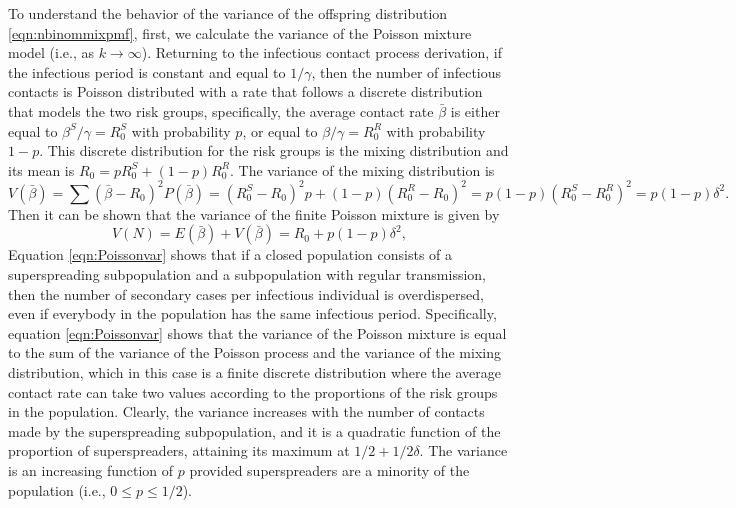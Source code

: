 \documentclass{imammb}
\numberwithin{equation}{section}
\begin{document}
To understand the behavior of the variance of the offspring distribution \eqref{eqn:nbinommixpmf}, first, we calculate the variance of the Poisson mixture model (i.e., as $k \rightarrow \infty$). Returning to the infectious contact process derivation, if the infectious period is constant and equal to $1/\gamma$, then the number of infectious contacts is Poisson distributed with a rate that follows a discrete distribution that models the two risk groups, specifically, the average contact rate $\bar{\beta}$ is either equal to $\beta^S/\gamma=R_0^S$ with probability $p$, or equal to $\beta/\gamma=R_0^R$ with probability $1-p$. This discrete distribution for the risk groups is the mixing distribution \citep{Karlis2005-az} and its mean is $R_0 = p R_0^S + (1-p) R_0^R$. The variance of the mixing distribution is 
\begin{equation}\label{eqn:mixingvar}
  V(\bar{\beta})  = \sum (\bar{\beta} - R_0)^2 P(\bar{\beta}) =  (R_0^S - R_0)^2 p + (1-p)(R_0^R - R_0)^2 = p(1-p)(R_0^S - R_0^R)^2 = p(1-p)\delta^2. 
\end{equation}
Then it can be shown that the variance of the finite Poisson mixture is  given by \citep{Karlis2005-az}
\begin{equation}\label{eqn:Poissonvar}
  V(N)  = E(\bar{\beta}) + V(\bar{\beta}) = R_0 + p(1-p)\delta^2, 
\end{equation}
Equation \eqref{eqn:Poissonvar} shows that if a closed population consists of a superspreading subpopulation and a subpopulation with regular transmission, then the number of secondary cases per infectious individual is overdispersed, even if everybody in the population has the same infectious period. Specifically, equation \eqref{eqn:Poissonvar} shows that the variance of the Poisson mixture is equal to the sum of the variance of the Poisson process and the variance of the mixing distribution, which in this case is a finite discrete distribution where the average contact rate can take two values according to the proportions of the risk groups in the population. Clearly, the variance increases with the number of contacts made by the superspreading subpopulation, and it is a quadratic function of the proportion of superspreaders, attaining its maximum at $1/2 + 1/2 \delta$. The variance is an increasing function of $p$ provided superspreaders are a minority of the population (i.e., $0\leq p \leq 1/2$).
\end{document}
